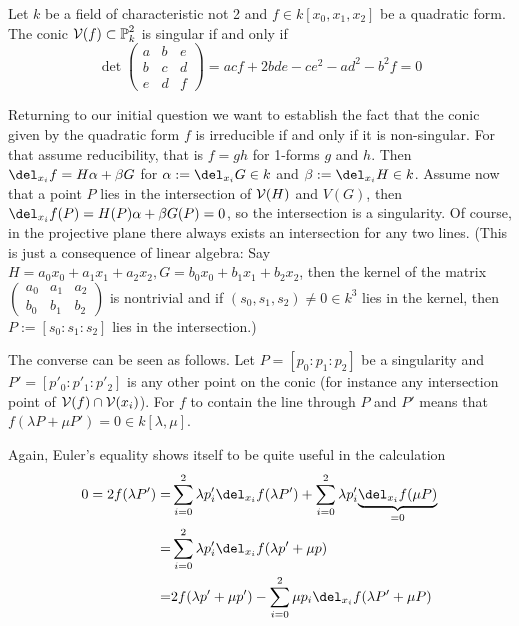 \begin{corollary}
Let $k$ be a field of characteristic not 2 and $f \in k[x_0,x_1,x_2]$ be a quadratic form. The conic $\operatorname{\mathcal V}(f) \subset \operatorname{\mathbb P}^2_k$ is singular if and only if
\begin{equation}
\det
\begin{pmatrix}
a & b & e \\
b & c & d \\
e & d & f
\end{pmatrix}
= acf + 2bde - ce^2 - ad^2 - b^2f = 0
\end{equation}
\end{corollary}

Returning to our initial question we want to establish the fact that the conic given by the quadratic form $f$ is irreducible if and only if it is non-singular.
For that assume reducibility, that is $f = gh$ for 1-forms $g$ and $h$. Then $\del_{x_i}f = H\alpha + \beta G$ for $\alpha := \del_{x_i}G \in k$ and $\beta := \del_{x_i}H \in k$.
Assume now that a point $P$ lies in the intersection of $\operatorname{\mathcal V}(H)$ and $V(G)$, then $\del_{x_i}f(P) = H(P)\alpha + \beta G(P) = 0$, so the intersection is a singularity. Of course, in the projective plane there always exists an intersection for any two lines.
(This is just a consequence of linear algebra: Say $H = a_0x_0 + a_1x_1 + a_2x_2, G = b_0x_0 + b_1x_1 + b_2x_2$, then the kernel of the matrix $\begin{pmatrix} a_0 & a_1 & a_2 \\ b_0 & b_1 & b_2 \end{pmatrix}$ is nontrivial and if $(s_0,s_1,s_2) \neq 0 \in k^3$ lies in the kernel, then $P := [s_0:s_1:s_2]$ lies in the intersection.)

The converse can be seen as follows. Let $P=[p_0:p_1:p_2]$ be a singularity and $P'=[p'_0:p'_1:p'_2]$ is any other point on the conic (for instance any intersection point of $\operatorname{\mathcal V}(f) \cap \operatorname{\mathcal V}(x_i)$). For $f$ to contain the line through $P$ and $P'$ means that $f(\lambda P + \mu P') = 0 \in k[\lambda,\mu]$.

Again, Euler's equality shows itself to be quite useful in the calculation
\begin{align}
0
= 2f(\lambda P')
=& \sum_{i=0}^2 \lambda p'_i \del_{x_i}f(\lambda P') 
+ \sum_{i=0}^2 \lambda p'_i \underset{=0}{\underbrace{\del_{x_i}f(\mu P)}}
\\
=& \sum_{i=0}^2 \lambda p'_i \del_{x_i} f(\lambda p'+\mu p) 
\\
=& 2f(\lambda p' + \mu p') - \sum_{i=0}^2 \mu p_i \del_{x_i}f(\lambda P' + \mu P)
\end{align}

